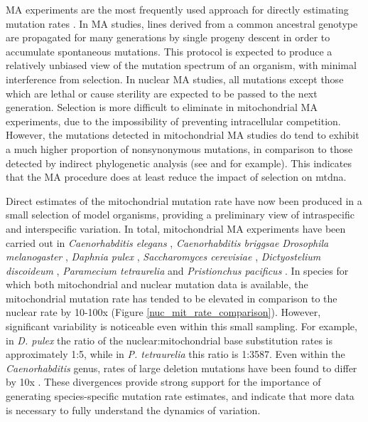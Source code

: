 \documentclass[12pt,twoside]{reedthesis}
\begin{document}
\gls{MA} experiments are the most frequently used approach for directly estimating mutation rates \citep{halligan_spontaneous_2009}.
In MA studies, lines derived from a common ancestral genotype are propagated for many generations by single progeny descent in order to accumulate spontaneous mutations.
This protocol is expected to produce a relatively unbiased view of the mutation spectrum of an organism, with minimal interference from selection.
In nuclear \gls{MA} studies, all mutations except those which are lethal or cause sterility are expected to be passed to the next generation.
Selection is more difficult to eliminate in mitochondrial \gls{MA} experiments, due to the impossibility of preventing intracellular competition.
However, the mutations detected in mitochondrial \gls{MA} studies do tend to exhibit a much higher proportion of nonsynonymous mutations, in comparison to those detected by indirect phylogenetic analysis (see \citealp{thomas_mode_1991} and \citealp{denver_high_2000} for example).
This indicates that the \gls{MA} procedure does at least reduce the impact of selection on \gls{mtdna}.

Direct estimates of the mitochondrial mutation rate have now been produced in a small selection of model organisms, providing a preliminary view of intraspecific and interspecific variation.
In total, mitochondrial \gls{MA} experiments have been carried out in \textit{Caenorhabditis elegans} \citep{denver_high_2000}, \textit{Caenorhabditis briggsae} \citep{howe_high_2010} \textit{Drosophila melanogaster} \citep{haag-liautard_direct_2008, keightley_analysis_2009}, \textit{Daphnia pulex} \citep{xu_high_2012}, \textit{Saccharomyces cerevisiae} \citep{lynch_genome-wide_2008}, \textit{Dictyostelium discoideum} \citep{saxer_whole_2012}, \textit{Paramecium tetraurelia} \citep{sung_extraordinary_2012} and \textit{Pristionchus pacificus} \citep{molnar_mutation_2011}. 
In species for which both mitochondrial and nuclear mutation data is available, the mitochondrial mutation rate has tended to be elevated in comparison to the nuclear rate by 10-100x (Figure \ref{nuc_mit_rate_comparison}).
However, significant variability is noticeable even within this small sampling.
For example, in \textit{D. pulex} the ratio of the nuclear:mitochondrial base substitution rates is approximately 1:5, while in \textit{P. tetraurelia} this ratio is 1:3587.
Even within the \textit{Caenorhabditis} genus, rates of large deletion mutations have been found to differ by 10x \citep{denver_high_2000, howe_high_2010}.
These divergences provide strong support for the importance of generating species-specific mutation rate estimates, and indicate that more data is necessary to fully understand the dynamics of variation. 
\end{document}
